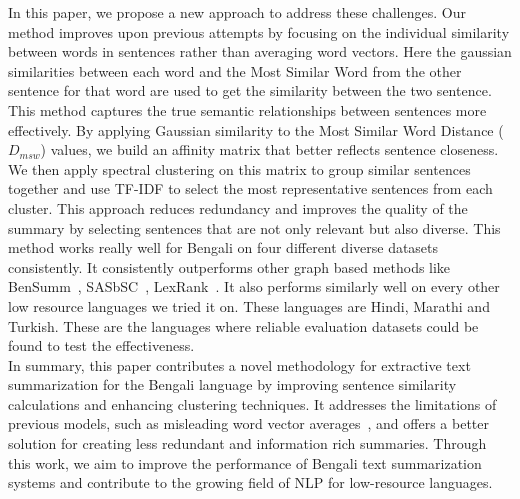In this paper, we propose a new approach to address these challenges.
Our method improves upon previous attempts by focusing on the individual similarity between words in sentences rather
than averaging word vectors.
Here the gaussian similarities between each word and the Most Similar Word from the other sentence for that word are
used to get the similarity between the two sentence.
This method captures the true semantic relationships between sentences more effectively.
By applying Gaussian similarity to the Most Similar Word Distance ($D_{msw}$) values, we build an affinity matrix that
better reflects sentence closeness.
We then apply spectral clustering on this matrix to group similar sentences together and use TF-IDF to select the
most representative sentences from each cluster.
This approach reduces redundancy and improves the quality of the summary by selecting sentences that are not only
relevant but also diverse.
This method works really well for Bengali on four different diverse datasets consistently.
It consistently outperforms other graph based methods like BenSumm~\cite{chowdhury-etal-2021-tfidf-clustering},
SASbSC~\cite{roychowdhury-etal-2022-spectral-base}, LexRank~\cite{Erkan-lexRank-2004}.
It also performs similarly well on every other low resource languages we tried it on.
These languages are Hindi, Marathi and Turkish.
These are the languages where reliable evaluation datasets could be found to test the effectiveness.\\

In summary, this paper contributes a novel methodology for extractive text summarization for the Bengali language by
improving sentence similarity calculations and enhancing clustering techniques.
It addresses the limitations of previous models, such as misleading word vector averages~\cite{roychowdhury-etal-2022-spectral-base},
and offers a better solution for creating less redundant and information rich summaries.
Through this work, we aim to improve the performance of Bengali text summarization systems and contribute to the
growing field of NLP for low-resource languages.
